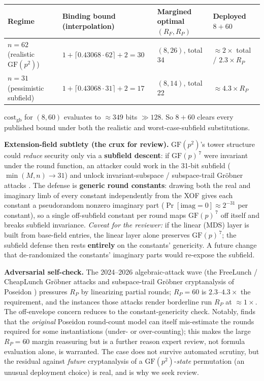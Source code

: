 \documentclass[11pt]{article}
\newcommand{\GF}[1]{\mathrm{GF}(#1)}
\theoremstyle{plain}
\theoremstyle{definition}
\begin{document}
\begin{table}[h]
\centering\footnotesize
\begin{tabular}{@{}llll@{}}
\toprule
Regime & Binding bound (interpolation) & Margined optimal $(R_F, R_P)$ & Deployed $8 + 60$ \\
\midrule
$n = 62$ (realistic $\GF{p^2}$)   & $1 + \lceil 0.43068 \cdot 62 \rceil + 2 = 30$ & $(8, 26)$, total 34 & $\approx 2\times$ total / $2.3\times R_P$ \\
$n = 31$ (pessimistic subfield)   & $1 + \lceil 0.43068 \cdot 31 \rceil + 2 = 17$ & $(8, 14)$, total 22 & $\approx 4.3\times R_P$ \\
\bottomrule
\end{tabular}
\end{table}

$\mathrm{cost}_{\mathrm{gb}}$ for $(8, 60)$ evaluates to $\approx 349$ bits $\gg 128$. So $8 + 60$
clears every published bound under both the realistic and worst-case-subfield substitutions.

\textbf{Extension-field subtlety (the crux for review).} $\GF{p^2}$'s tower structure could
\emph{reduce} security only via a \textbf{subfield descent}: if $\GF{p}^{\,7}$ were invariant under
the round function, an attacker could work in the 31-bit subfield ($\min(M,n) \to 31$) and unlock
invariant-subspace / subspace-trail Gr\"obner attacks \cite{Bariant22,GKR25}. The defense is
\textbf{generic round constants}: drawing both the real and imaginary limb of every constant
independently from the XOF gives each constant a pseudorandom nonzero imaginary part
($\Pr[\mathrm{imag} = 0] \approx 2^{-31}$ per constant), so a single off-subfield constant per round
maps $\GF{p}^{\,7}$ off itself and breaks subfield invariance. \emph{Caveat for the reviewer:} if the
linear (MDS) layer is built from base-field entries, the linear layer alone preserves $\GF{p}^{\,7}$;
the subfield defense then rests \textbf{entirely} on the constants' genericity. A future change that
de-randomized the constants' imaginary parts would re-expose the subfield.

\textbf{Adversarial self-check.} The 2024--2026 algebraic-attack wave (the FreeLunch / CheapLunch
Gr\"obner attacks \cite{FreeLunch,CheapLunch} and subspace-trail Gr\"obner cryptanalysis of Poseidon
\cite{GKR25}) pressures $R_P$ by linearizing partial rounds; $R_P = 60$ is $2.3$--$4.3\times$ the
requirement, and the instances those attacks render borderline run $R_P$ at $\approx 1\times$. The
off-envelope concern reduces to the constant-genericity check. Notably, \cite{GKR25} finds that the
\emph{original} Poseidon round-count model can itself mis-estimate the rounds required for some
instantiations (under- or over-counting); this makes the large $R_P = 60$ margin reassuring but is a
further reason expert review, not formula evaluation alone, is warranted. The case does not survive
automated scrutiny, but the residual against \emph{future} cryptanalysis of a $\GF{p^2}$-\emph{state}
permutation (an unusual deployment choice) is real, and is why we seek review.
\end{document}
